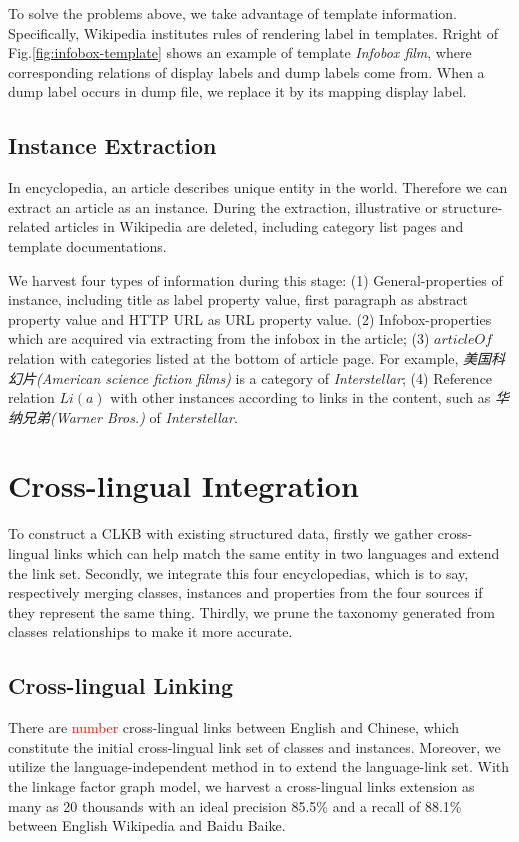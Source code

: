 \documentclass[runningheads,a4paper]{llncs}
\begin{document}
To solve the problems above, we take advantage of template information. Specifically, Wikipedia institutes rules of rendering label in templates. Rright of Fig.\ref{fig:infobox-template} shows an example of template \emph{Infobox film}, where corresponding relations of display labels and dump labels come from. When a dump label occurs in dump file, we replace it by its mapping display label.

\subsection{Instance Extraction}
\label{sec:ie}
In encyclopedia, an article describes unique entity in the world. Therefore we can extract an article as an instance. During the extraction, illustrative or structure-related articles in Wikipedia are deleted, including category list pages and template documentations.

We harvest four types of information during this stage: (1) General-properties of instance, including title as label property value, first paragraph as abstract property value and HTTP URL as URL property value. (2) Infobox-properties which are acquired via extracting from the infobox in the article; (3) $articleOf$ relation with categories listed at the bottom of article page. For example, \textit{美国科幻片(American science fiction films)} is a category of \textit{Interstellar}; (4) Reference relation $Li(a)$ with other instances according to links in the content, such as \textit{华纳兄弟(Warner Bros.)} of \textit{Interstellar}.

\section{Cross-lingual Integration}
\label{sec:clkbb}

To construct a CLKB with existing structured data, firstly we gather cross-lingual links which can help match the same entity in two languages and extend the link set. Secondly, we integrate this four encyclopedias, which is to say, respectively merging classes, instances and properties from the four sources if they represent the same thing. Thirdly, we prune the taxonomy generated from classes relationships to make it more accurate. 

\subsection{Cross-lingual Linking}
There are \textcolor{red}{number} cross-lingual links between English and Chinese, which constitute the initial cross-lingual link set of classes and instances. Moreover, we utilize the language-independent method in \cite{wang2012cross} to extend the language-link set. With the linkage factor graph model, we harvest a cross-lingual links extension as many as 20 thousands with an ideal precision 85.5\% and a recall of 88.1\% between English Wikipedia and Baidu Baike.
\end{document}

